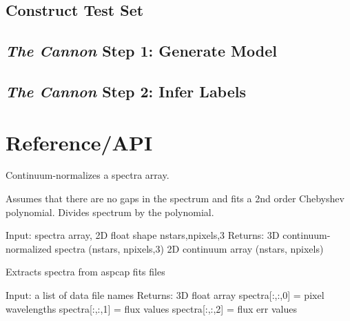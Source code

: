 \documentclass[letterpaper,10pt,english]{sphinxmanual}
\begin{document}
\section{Construct Test Set}
\label{index:construct-test-set}

\section{\emph{The Cannon} Step 1: Generate Model}
\label{index:the-cannon-step-1-generate-model}

\section{\emph{The Cannon} Step 2: Infer Labels}
\label{index:the-cannon-step-2-infer-labels}

\chapter{Reference/API}
\label{index:reference-api}\label{index:module-prep_data}

\begin{fulllineitems}
\label{index:prep_data.continuum_normalize}
Continuum-normalizes a spectra array.

Assumes that there are no gaps in the spectrum and fits a 2nd order
Chebyshev polynomial. Divides spectrum by the polynomial.

Input: spectra array, 2D float shape nstars,npixels,3
Returns: 3D continuum-normalized spectra (nstars, npixels,3)
2D continuum array (nstars, npixels)

\end{fulllineitems}


\begin{fulllineitems}
\label{index:prep_data.get_spectra}
Extracts spectra from aspcap fits files

Input: a list of data file names 
Returns: 3D float array 
spectra{[}:,:,0{]} = pixel wavelengths
spectra{[}:,:,1{]} = flux values
spectra{[}:,:,2{]} = flux err values

\end{fulllineitems}
\end{document}

